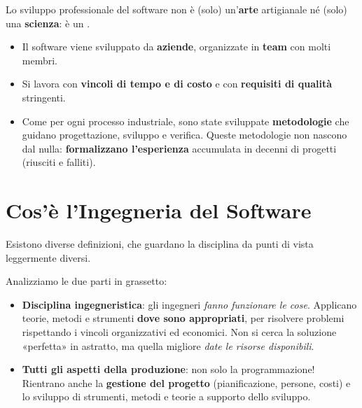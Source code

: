 Lo sviluppo professionale del software non è (solo) un'\textbf{arte} artigianale né (solo) una \textbf{scienza}: è un .
\begin{itemize}
  \item Il software viene sviluppato da \textbf{aziende}, organizzate in \textbf{team} con molti membri.
  \item Si lavora con \textbf{vincoli di tempo e di costo} e con \textbf{requisiti di qualità} stringenti.
  \item Come per ogni processo industriale, sono state sviluppate \textbf{metodologie} che guidano progettazione, sviluppo e verifica.
        Queste metodologie non nascono dal nulla: \textbf{formalizzano l'esperienza} accumulata in decenni di progetti (riusciti e falliti).
\end{itemize}


\section{Cos'è l'Ingegneria del Software}

Esistono diverse definizioni, che guardano la disciplina da punti di vista leggermente diversi.


Analizziamo le due parti in grassetto:
\begin{itemize}
  \item \textbf{Disciplina ingegneristica}: gli ingegneri \textit{fanno funzionare le cose}. Applicano teorie, metodi e strumenti
        \textbf{dove sono appropriati}, per risolvere problemi rispettando i vincoli organizzativi ed economici. Non si cerca la soluzione
        «perfetta» in astratto, ma quella migliore \textit{date le risorse disponibili}.
  \item \textbf{Tutti gli aspetti della produzione}: non solo la programmazione! Rientrano anche la \textbf{gestione del progetto}
        (pianificazione, persone, costi) e lo sviluppo di strumenti, metodi e teorie a supporto dello sviluppo.
\end{itemize}

